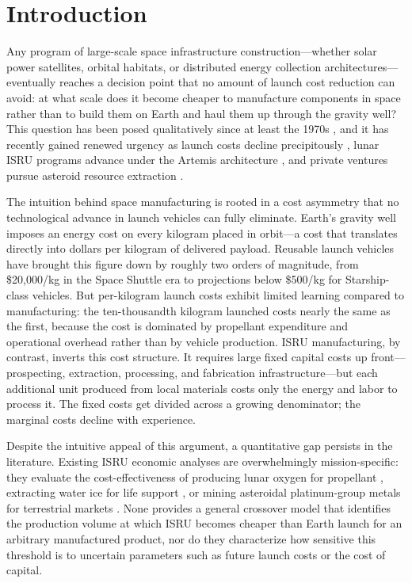 \documentclass[preprint,12pt]{elsarticle}
\begin{document}
\linenumbers

\section{Introduction}
\label{sec:introduction}

Any program of large-scale space infrastructure construction---whether solar power satellites, orbital habitats, or distributed energy collection architectures---eventually reaches a decision point that no amount of launch cost reduction can avoid: at what scale does it become cheaper to manufacture components in space rather than to build them on Earth and haul them up through the gravity well? This question has been posed qualitatively since at least the 1970s \cite{oneill1974,oneill1976}, and it has recently gained renewed urgency as launch costs decline precipitously \cite{jones2018}, lunar ISRU programs advance under the Artemis architecture \cite{sanders2015}, and private ventures pursue asteroid resource extraction \cite{elvis2012,andrews2015}.

The intuition behind space manufacturing is rooted in a cost asymmetry that no technological advance in launch vehicles can fully eliminate. Earth's gravity well imposes an energy cost on every kilogram placed in orbit---a cost that translates directly into dollars per kilogram of delivered payload. Reusable launch vehicles have brought this figure down by roughly two orders of magnitude, from \$20{,}000/kg in the Space Shuttle era to projections below \$500/kg for Starship-class vehicles. But per-kilogram launch costs exhibit limited learning compared to manufacturing: the ten-thousandth kilogram launched costs nearly the same as the first, because the cost is dominated by propellant expenditure and operational overhead rather than by vehicle production. ISRU manufacturing, by contrast, inverts this cost structure. It requires large fixed capital costs up front---prospecting, extraction, processing, and fabrication infrastructure---but each additional unit produced from local materials costs only the energy and labor to process it. The fixed costs get divided across a growing denominator; the marginal costs decline with experience.

Despite the intuitive appeal of this argument, a quantitative gap persists in the literature. Existing ISRU economic analyses are overwhelmingly mission-specific: they evaluate the cost-effectiveness of producing lunar oxygen for propellant \cite{sanders2015}, extracting water ice for life support \cite{zubrin1996}, or mining asteroidal platinum-group metals for terrestrial markets \cite{sonter1997,elvis2012}. None provides a general crossover model that identifies the production volume at which ISRU becomes cheaper than Earth launch for an arbitrary manufactured product, nor do they characterize how sensitive this threshold is to uncertain parameters such as future launch costs or the cost of capital.
\end{document}
